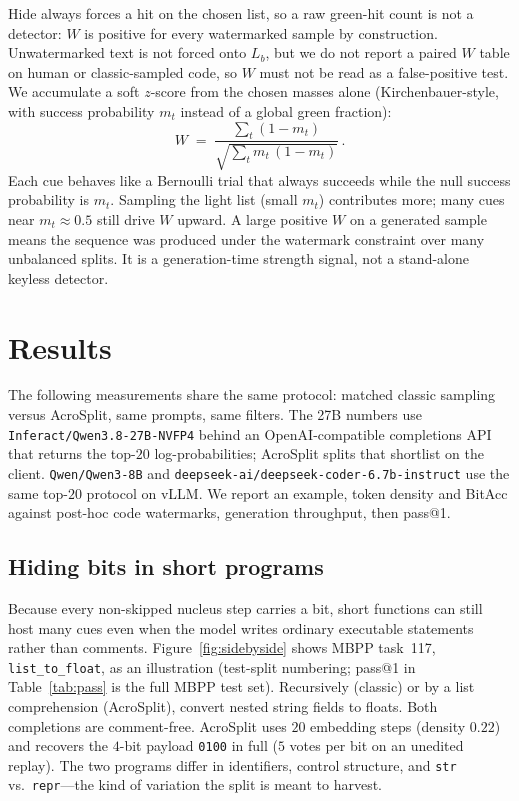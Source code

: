 \documentclass[11pt]{article}
\begin{document}
Hide always forces a hit on the chosen list, so a raw green-hit count is not a detector: $W$ is positive for every watermarked sample by construction.
Unwatermarked text is not forced onto $L_b$, but we do not report a paired $W$ table on human or classic-sampled code, so $W$ must not be read as a false-positive test.
We accumulate a soft $z$-score from the chosen masses alone (Kirchenbauer-style, with success probability $m_t$ instead of a global green fraction):
\begin{equation}
  W \;=\;
  \frac{\sum_t (1 - m_t)}
       {\sqrt{\sum_t m_t\,(1 - m_t)}}\,.
  \label{eq:wscore}
\end{equation}
Each cue behaves like a Bernoulli trial that always succeeds while the null success probability is $m_t$.
Sampling the light list (small $m_t$) contributes more; many cues near $m_t \approx 0.5$ still drive $W$ upward.
A large positive $W$ on a generated sample means the sequence was produced under the watermark constraint over many unbalanced splits.
It is a generation-time strength signal, not a stand-alone keyless detector.

\section{Results}
\label{sec:results}

The following measurements share the same protocol: matched classic sampling versus AcroSplit, same prompts, same filters.
The 27B numbers use \texttt{Inferact/Qwen3.8-27B-NVFP4} behind an OpenAI-compatible completions API that returns the top-$20$ log-probabilities; AcroSplit splits that shortlist on the client.
\texttt{Qwen/Qwen3-8B} and \texttt{deepseek-ai/deepseek-coder-6.7b-instruct} use the same top-$20$ protocol on vLLM.
We report an example, token density and BitAcc against post-hoc code watermarks, generation throughput, then pass@1.

\subsection{Hiding bits in short programs}
\label{sec:example}

Because every non-skipped nucleus step carries a bit, short functions can still host many cues even when the model writes ordinary executable statements rather than comments.
Figure~\ref{fig:sidebyside} shows MBPP task~117, \texttt{list\_to\_float}, as an illustration (test-split numbering; pass@1 in Table~\ref{tab:pass} is the full MBPP test set).
Recursively (classic) or by a list comprehension (AcroSplit), convert nested string fields to floats.
Both completions are comment-free.
AcroSplit uses $20$ embedding steps (density $0.22$) and recovers the $4$-bit payload \texttt{0100} in full ($5$ votes per bit on an unedited replay).
The two programs differ in identifiers, control structure, and \texttt{str} vs.\ \texttt{repr}---the kind of variation the split is meant to harvest.
\end{document}
